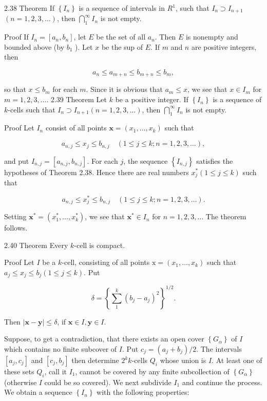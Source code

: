 \documentclass[10pt]{article}
\begin{document}
2.38 Theorem If $\left\{I_{n}\right\}$ is a sequence of intervals in $R^{1}$, such that $I_{n} \supset I_{n+1}$ $(n=1,2,3, \ldots)$, then $\bigcap_{1}^{\infty} I_{n}$ is not empty.

Proof If $I_{n}=\left[a_{n}, b_{n}\right]$, let $E$ be the set of all $a_{n}$. Then $E$ is nonempty and bounded above (by $b_{1}$ ). Let $x$ be the sup of $E$. If $m$ and $n$ are positive integers, then

$$
a_{n} \leq a_{m+n} \leq b_{m+n} \leq b_{m},
$$

so that $x \leq b_{m}$ for each $m$. Since it is obvious that $a_{m} \leq x$, we see that $x \in I_{m}$ for $m=1,2,3, \ldots$. 2.39 Theorem Let $k$ be a positive integer. If $\left\{I_{n}\right\}$ is a sequence of $k$-cells such that $I_{n} \supset I_{n+1}(n=1,2,3, \ldots)$, then $\bigcap_{1}^{\infty} I_{n}$ is not empty.

Proof Let $I_{n}$ consist of all points $\mathbf{x}=\left(x_{1}, \ldots, x_{k}\right)$ such that

$$
a_{n, j} \leq x_{j} \leq b_{n, j} \quad(1 \leq j \leq k ; n=1,2,3, \ldots),
$$

and put $I_{n, j}=\left[a_{n, j}, b_{n, j}\right]$. For each $j$, the sequence $\left\{I_{n, j}\right\}$ satisfies the hypotheses of Theorem 2.38. Hence there are real numbers $x_{j}^{*}(1 \leq j \leq k)$ such that

$$
a_{n, j} \leq x_{j}^{*} \leq b_{n, j} \quad(1 \leq j \leq k ; n=1,2,3, \ldots) .
$$

Setting $\mathbf{x}^{*}=\left(x_{1}^{*}, \ldots, x_{k}^{*}\right)$, we see that $\mathbf{x}^{*} \in I_{n}$ for $n=1,2,3, \ldots$ The theorem follows.

2.40 Theorem Every $k$-cell is compact.

Proof Let $I$ be a $k$-cell, consisting of all points $\mathrm{x}=\left(x_{1}, \ldots, x_{k}\right)$ such that $a_{j} \leq x_{j} \leq b_{j}(1 \leq j \leq k)$. Put

$$
\delta=\left\{\sum_{1}^{k}\left(b_{j}-a_{j}\right)^{2}\right\}^{1 / 2} .
$$

Then $|\mathbf{x}-\mathbf{y}| \leq \delta$, if $\mathbf{x} \in I, \mathbf{y} \in I$.

Suppose, to get a contradiction, that there exists an open cover $\left\{G_{\alpha}\right\}$ of $I$ which contains no finite subcover of $I$. Put $c_{j}=\left(a_{j}+b_{j}\right) / 2$. The intervals $\left[a_{j}, c_{j}\right]$ and $\left[c_{j}, b_{j}\right]$ then determine $2^{k} k$-cells $Q_{i}$ whose union is $I$. At least one of these sets $Q_{i}$, call it $I_{1}$, cannot be covered by any finite subcollection of $\left\{G_{\alpha}\right\}$ (otherwise $I$ could be so covered). We next subdivide $I_{1}$ and continue the process. We obtain a sequence $\left\{I_{n}\right\}$ with the following properties:
\end{document}

